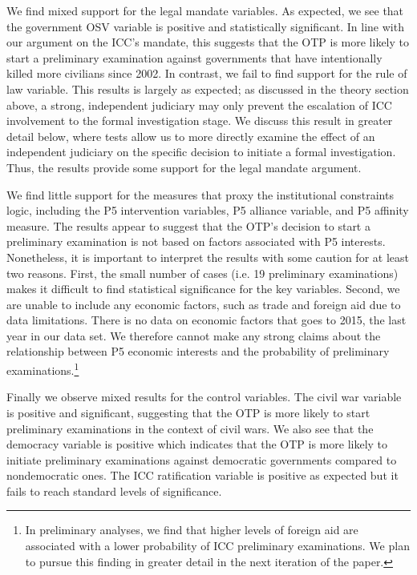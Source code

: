 We find mixed support for the legal mandate variables.  As expected, we see that the government OSV variable is positive and statistically significant. In line with our argument on the ICC’s mandate, this suggests that the OTP is more likely to start a preliminary examination against governments that have intentionally killed more civilians since 2002.  In contrast, we fail to find support for the rule of law variable. This results is largely as expected; as discussed in the theory section above, a strong, independent judiciary may only prevent the escalation of ICC involvement to the formal investigation stage. We discuss this result in greater detail below, where tests allow us to more directly examine the effect of an independent judiciary on the specific decision to initiate a formal investigation. Thus, the results provide some support for the legal mandate argument.

We find little support for the measures that proxy the institutional constraints logic, including the P5 intervention variables, P5 alliance variable, and P5 affinity measure. The results appear to suggest that the OTP’s decision to start a preliminary examination is not based on factors associated with P5 interests.  Nonetheless, it is important to interpret the results with some caution for at least two reasons. First, the small number of cases (i.e. 19 preliminary examinations) makes it difficult to find statistical significance for the key variables. Second, we are unable to include any economic factors, such as trade and foreign aid due to data limitations. There is no data on economic factors that goes to 2015, the last year in our data set. We therefore cannot make any strong claims about the relationship between P5 economic interests and the probability of preliminary examinations.\footnote{In preliminary analyses, we find that higher levels of foreign aid are associated with a lower probability of ICC preliminary examinations.  We plan to pursue this finding in greater detail in the next iteration of the paper.}

Finally we observe mixed results for the control variables. The civil war variable is positive and significant, suggesting that the OTP is more likely to start preliminary examinations in the context of civil wars. We also see that the democracy variable is positive which indicates that the OTP is more likely to initiate preliminary examinations against democratic governments compared to nondemocratic ones.  The ICC ratification variable is positive as expected but it fails to reach standard levels of significance.

